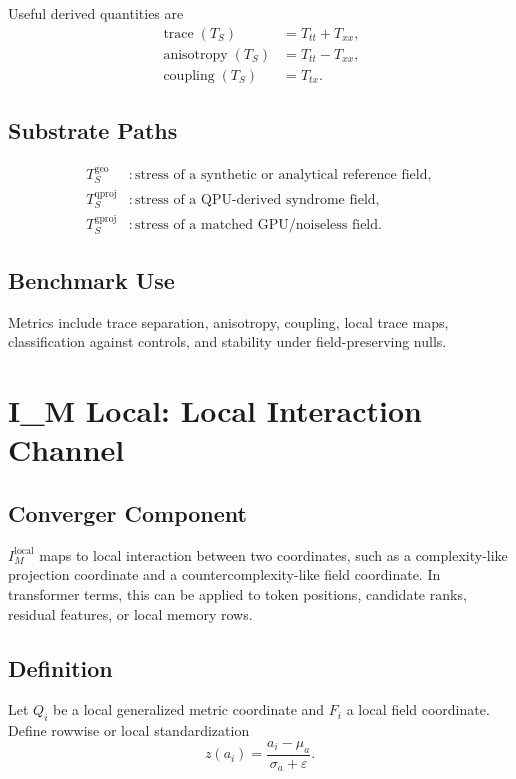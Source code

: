 \documentclass[11pt]{article}
\newcommand{\Ts}{T_S}
\newcommand{\Iml}{I_M^{\mathrm{local}}}
\newcommand{\geo}{\mathrm{geo}}
\newcommand{\qproj}{\mathrm{qproj}}
\newcommand{\gproj}{\mathrm{gproj}}
\begin{document}
Useful derived quantities are
\begin{align}
  \operatorname{trace}(\Ts) &= T_{tt}+T_{xx},\\
  \operatorname{anisotropy}(\Ts) &= T_{tt}-T_{xx},\\
  \operatorname{coupling}(\Ts) &= T_{tx}.
\end{align}

\subsection{Substrate Paths}

\begin{align}
  \Ts^{\geo}   &: \text{stress of a synthetic or analytical reference field},\\
  \Ts^{\qproj} &: \text{stress of a QPU-derived syndrome field},\\
  \Ts^{\gproj} &: \text{stress of a matched GPU/noiseless field}.
\end{align}

\subsection{Benchmark Use}

Metrics include trace separation, anisotropy, coupling, local trace maps,
classification against controls, and stability under field-preserving nulls.

\section{I\_M Local: Local Interaction Channel}

\subsection{Converger Component}

\(\Iml\) maps to local interaction between two coordinates, such as a
complexity-like projection coordinate and a countercomplexity-like field
coordinate. In transformer terms, this can be applied to token positions,
candidate ranks, residual features, or local memory rows.

\subsection{Definition}

Let \(Q_i\) be a local generalized metric coordinate and \(F_i\) a local field
coordinate. Define rowwise or local standardization
\begin{equation}
  z(a_i) = \frac{a_i-\mu_a}{\sigma_a+\varepsilon}.
\end{equation}
\end{document}

